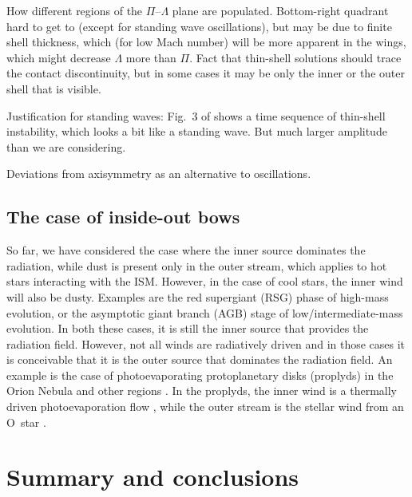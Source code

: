 How different regions of the \(\Pi\)--\(\Lambda\) plane are populated.
Bottom-right quadrant hard to get to (except for standing wave
oscillations), but may be due to finite shell thickness, which (for
low Mach number) will be more apparent in the wings, which might
decrease \(\Lambda\) more than \(\Pi\).  Fact that thin-shell solutions should
trace the contact discontinuity, but in some cases it may be only the
inner or the outer shell that is visible.

Justification for standing waves: Fig.~3 of \citet{Meyer:2016a} shows
a time sequence of thin-shell instability, which looks a bit like a
standing wave. But much larger amplitude than we are considering.

Deviations from axisymmetry as an alternative to oscillations. 


\subsection{The case of inside-out bows}
\label{sec:case-inside-out}

So far, we have considered the case where the inner source dominates
the radiation, while dust is present only in the outer stream, which
applies to hot stars interacting with the ISM.  However, in the case
of cool stars, the inner wind will also be dusty.  Examples are the
red supergiant (RSG) phase of high-mass evolution, or the asymptotic
giant branch (AGB) stage of low/intermediate-mass evolution.  In both
these cases, it is still the inner source that provides the radiation
field.  However, not all winds are radiatively driven and in those
cases it is conceivable that it is the outer source that dominates the
radiation field.  An example is the case of photoevaporating
protoplanetary disks (proplyds) in the Orion Nebula and other \hii{}
regions \citep{ODell:1994a}.  In the proplyds, the inner wind is a
thermally driven photoevaporation flow \citep{Henney:1998b, Henney:1999a},
while the outer stream is the stellar wind from an O~star
\citep{Garcia-Arredondo:2001a}.


\section{Summary and conclusions}
\label{sec:conclusions}



